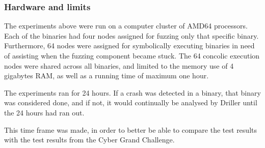 \documentclass[a4paper]{article}
\begin{document}
\subsubsection{Hardware and limits}
\label{sec:Hardware}
The experiments above were run on a computer cluster of AMD64 processors. Each of the binaries had four nodes assigned for fuzzing only that specific binary. Furthermore, 64 nodes were assigned for symbolically executing binaries in need of assisting when the fuzzing component became stuck. The 64 concolic execution nodes were shared across all binaries, and limited to the memory use of 4 gigabytes RAM, as well as a running time of maximum one hour.

The experiments ran for 24 hours. If a crash was detected in a binary, that binary was considered done, and if not, it would continually be analysed by Driller until the 24 hours had ran out.

This time frame was made, in order to better be able to compare the test results with the test results from the Cyber Grand Challenge.
\end{document}
